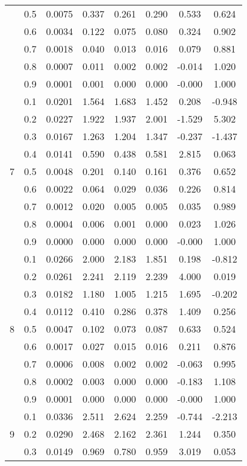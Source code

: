 \documentclass[11pt,a4paper]{report}
\begin{document}
\begin{longtable}{ | c | c || c | c | c | c | c | c | }
 & 0.5 & 0.0075 & 0.337 & 0.261 & 0.290 & 0.533 & 0.624 \\
 & 0.6 & 0.0034 & 0.122 & 0.075 & 0.080 & 0.324 & 0.902 \\
 & 0.7 & 0.0018 & 0.040 & 0.013 & 0.016 & 0.079 & 0.881 \\
 & 0.8 & 0.0007 & 0.011 & 0.002 & 0.002 & -0.014 & 1.020 \\
 & 0.9 & 0.0001 & 0.001 & 0.000 & 0.000 & -0.000 & 1.000 \\
 \hline
\multirow{9}{*}{7} & 0.1 & 0.0201 & 1.564 & 1.683 & 1.452 & 0.208 & -0.948 \\
 & 0.2 & 0.0227 & 1.922 & 1.937 & 2.001 & -1.529 & 5.302 \\
 & 0.3 & 0.0167 & 1.263 & 1.204 & 1.347 & -0.237 & -1.437 \\
 & 0.4 & 0.0141 & 0.590 & 0.438 & 0.581 & 2.815 & 0.063 \\
 & 0.5 & 0.0048 & 0.201 & 0.140 & 0.161 & 0.376 & 0.652 \\
 & 0.6 & 0.0022 & 0.064 & 0.029 & 0.036 & 0.226 & 0.814 \\
 & 0.7 & 0.0012 & 0.020 & 0.005 & 0.005 & 0.035 & 0.989 \\
 & 0.8 & 0.0004 & 0.006 & 0.001 & 0.000 & 0.023 & 1.026 \\
 & 0.9 & 0.0000 & 0.000 & 0.000 & 0.000 & -0.000 & 1.000 \\
 \hline
\multirow{9}{*}{8} & 0.1 & 0.0266 & 2.000 & 2.183 & 1.851 & 0.198 & -0.812 \\
 & 0.2 & 0.0261 & 2.241 & 2.119 & 2.239 & 4.000 & 0.019 \\
 & 0.3 & 0.0182 & 1.180 & 1.005 & 1.215 & 1.695 & -0.202 \\
 & 0.4 & 0.0112 & 0.410 & 0.286 & 0.378 & 1.409 & 0.256 \\
 & 0.5 & 0.0047 & 0.102 & 0.073 & 0.087 & 0.633 & 0.524 \\
 & 0.6 & 0.0017 & 0.027 & 0.015 & 0.016 & 0.211 & 0.876 \\
 & 0.7 & 0.0006 & 0.008 & 0.002 & 0.002 & -0.063 & 0.995 \\
 & 0.8 & 0.0002 & 0.003 & 0.000 & 0.000 & -0.183 & 1.108 \\
 & 0.9 & 0.0001 & 0.000 & 0.000 & 0.000 & -0.000 & 1.000 \\
 \hline
\multirow{9}{*}{9} & 0.1 & 0.0336 & 2.511 & 2.624 & 2.259 & -0.744 & -2.213 \\
 & 0.2 & 0.0290 & 2.468 & 2.162 & 2.361 & 1.244 & 0.350 \\
 & 0.3 & 0.0149 & 0.969 & 0.780 & 0.959 & 3.019 & 0.053 \\

\end{longtable}
\end{document}
